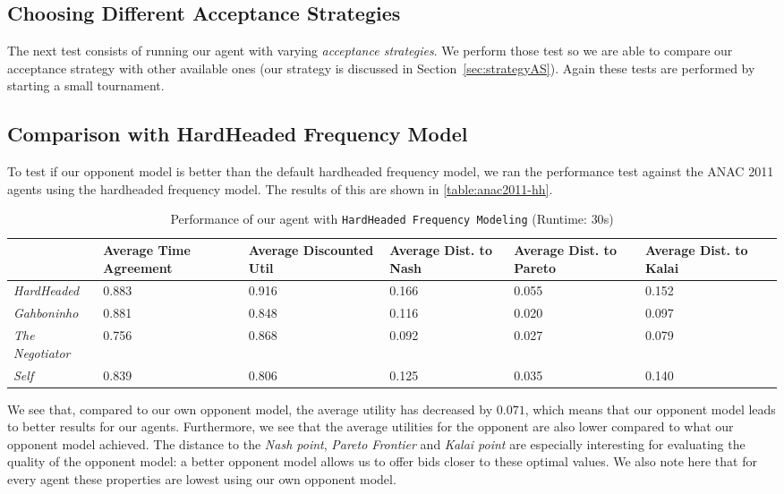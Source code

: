 
\subsection{Choosing Different Acceptance Strategies}

The next test consists of running our agent with varying \emph{acceptance strategies}. We perform those test so we are able to compare our acceptance strategy with other available ones (our strategy is discussed in Section~\ref{sec:strategyAS}). Again these tests are performed by starting a small tournament. \\


\subsection{Comparison with HardHeaded Frequency Model}
To test if our opponent model is better than the default hardheaded frequency model, we ran the performance test against the ANAC 2011 agents using the hardheaded frequency model. The results of this are shown in \autoref{table:anac2011-hh}.
\begin{table}[H]
	\centering
	\small
    \begin{tabular}{l|p{2cm}|p{2cm}|p{2cm}|p{2cm}|p{2cm}|p{2cm}|}
    ~              & Average Time Agreement & Average Discounted Util & Average Dist. to Nash & Average Dist. to Pareto & Average Dist. to Kalai \\
    \hline
    \emph{HardHeaded}		& 0.883  & 0.916  & 0.166  & 0.055  & 0.152   \\ \hline
    \emph{Gahboninho}   	& 0.881  & 0.848  & 0.116  & 0.020  & 0.097   \\ \hline
    \emph{The Negotiator} 	& 0.756  & 0.868  & 0.092  & 0.027  & 0.079   \\ \hline
    \emph{Self}                 & 0.839  & 0.806  & 0.125  & 0.035  & 0.140   \\ \hline
    \end{tabular}
    \caption{Performance of our agent with \texttt{HardHeaded Frequency Modeling} (Runtime: $30$s) \label{table:anac2011-hh}}
\end{table}
We see that, compared to our own opponent model, the average utility has decreased by $0.071$, which means that our opponent model leads to  better results for our agents. 
Furthermore, we see that the average utilities for the opponent are also lower compared to what our opponent model achieved.
The distance to the \emph{Nash point}, \emph{Pareto Frontier} and \emph{Kalai point} are especially interesting for evaluating the quality of the opponent model: a better opponent model allows us to offer bids closer to these optimal values. We also note here that for every agent these properties are lowest using our own opponent model.

